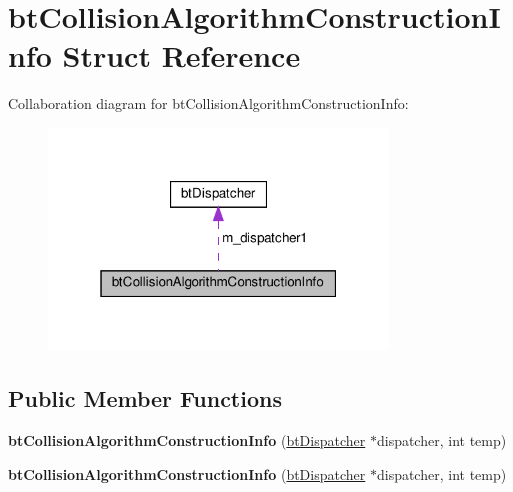 \hypertarget{structbtCollisionAlgorithmConstructionInfo}{}\section{bt\+Collision\+Algorithm\+Construction\+Info Struct Reference}
\label{structbtCollisionAlgorithmConstructionInfo}


Collaboration diagram for bt\+Collision\+Algorithm\+Construction\+Info\+:
\nopagebreak
\begin{figure}[H]
\begin{center}
\leavevmode
\includegraphics[width=256pt]{structbtCollisionAlgorithmConstructionInfo__coll__graph}
\end{center}
\end{figure}
\subsection*{Public Member Functions}
\begin{DoxyCompactItemize}
\item 
\mbox{\label{structbtCollisionAlgorithmConstructionInfo_a41dd8dda48f2e63f219c54ef7e5a3e14}} 
{\bfseries bt\+Collision\+Algorithm\+Construction\+Info} (\hyperlink{classbtDispatcher}{bt\+Dispatcher} $\ast$dispatcher, int temp)
\item 
\mbox{\label{structbtCollisionAlgorithmConstructionInfo_a41dd8dda48f2e63f219c54ef7e5a3e14}} 
{\bfseries bt\+Collision\+Algorithm\+Construction\+Info} (\hyperlink{classbtDispatcher}{bt\+Dispatcher} $\ast$dispatcher, int temp)
\end{DoxyCompactItemize}
